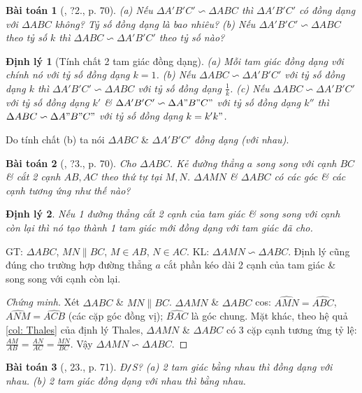 \documentclass{article}
\newtheorem{baitoan}{Bài toán}
\newtheorem{dinhly}{Định lý}
\begin{document}
\begin{baitoan}[\cite{SGK_Toan_8_tap_2}, ?2., p. 70]
	(a) Nếu $\Delta A'B'C'\backsim\Delta ABC$ thì $\Delta A'B'C'$ có đồng dạng với $\Delta ABC$ không? Tỷ số đồng dạng là bao nhiêu? (b) Nếu $\Delta A'B'C'\backsim\Delta ABC$ theo tỷ số $k$ thì $\Delta ABC\backsim\Delta A'B'C'$ theo tỷ số nào?
\end{baitoan}

\begin{dinhly}[Tính chất 2 tam giác đồng dạng]
	(a) Mỗi tam giác đồng dạng với chính nó với tỷ số đồng dạng $k = 1$. (b) Nếu $\Delta ABC\backsim\Delta A'B'C'$ với tỷ số đồng dạng $k$ thì $\Delta A'B'C'\backsim\Delta ABC$ với tỷ số đồng dạng $\frac{1}{k}$. (c) Nếu $\Delta ABC\backsim\Delta A'B'C'$ với tỷ số đồng dạng $k'$ \& $\Delta A'B'C'\backsim\Delta A"B"C"$ với tỷ số đồng dạng $k''$ thì $\Delta ABC\backsim\Delta A"B"C"$ với tỷ số đồng dạng $k = k'k"$.
\end{dinhly}
Do tính chất (b) ta nói $\Delta ABC$ \& $\Delta A'B'C'$ \textit{đồng dạng (với nhau)}.

\begin{baitoan}[\cite{SGK_Toan_8_tap_2}, ?3., p. 70]
	Cho $\Delta ABC$. Kẻ đường thẳng $a$ song song với cạnh $BC$ \& cắt 2 cạnh $AB,AC$ theo thứ tự tại $M,N$. $\Delta AMN$ \& $\Delta ABC$ có các góc \& các cạnh tương ứng như thế nào?
\end{baitoan}

\begin{dinhly}
	Nếu 1 đường thẳng cắt 2 cạnh của tam giác \& song song với cạnh còn lại thì nó tạo thành 1 tam giác mới đồng dạng với tam giác đã cho.
\end{dinhly}
GT: $\Delta ABC$, $MN\parallel BC$, $M\in AB$, $N\in AC$. KL: $\Delta AMN\backsim\Delta ABC$. Định lý cũng đúng cho trường hợp đường thẳng $a$ cắt phần kéo dài 2 cạnh của tam giác \& song song với cạnh còn lại.

\begin{proof}[Chứng minh]
	Xét $\Delta ABC$ \& $MN\parallel BC$. $\Delta AMN$ \& $\Delta ABC$ cos: $\widehat{AMN} = \widehat{ABC}$, $\widehat{ANM} = \widehat{ACB}$ (các cặp góc đồng vị); $\widehat{BAC}$ là góc chung. Mặt khác, theo hệ quả \ref{col: Thales} của định lý Thales, $\Delta AMN$ \& $\Delta ABC$ có 3 cặp cạnh tương ứng tỷ lệ: $\frac{AM}{AB} = \frac{AN}{AC} = \frac{MN}{BC}$. Vậy $\Delta AMN\backsim\Delta ABC$.
\end{proof}

\begin{baitoan}[\cite{SGK_Toan_8_tap_2}, 23., p. 71]
	\emph{Đ\texttt{/}S?} (a) 2 tam giác bằng nhau thì đồng dạng với nhau. (b) 2 tam giác đồng dạng với nhau thì bằng nhau.
\end{baitoan}
\end{document}
